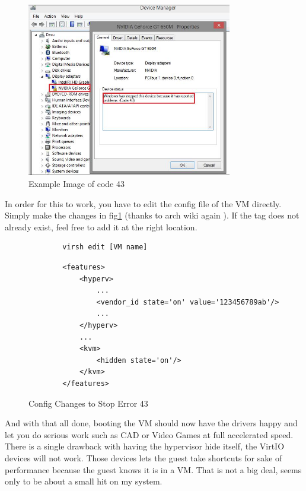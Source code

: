 \documentclass[12pt]{article}
\begin{document}
\begin{figure}[ht]
	\centering
	\includegraphics[width=0.8\textwidth]{error_43.jpg}
	\caption{Example Image of code 43 \cite{image_code43}}
\end{figure}

In order for this to work, you have to edit the config file of the VM directly.
Simply make the changes in fig\ref{fig:config_edit} (thanks to arch wiki again \cite{wiki_arch_ovmf}).
If the tag does not already exist, feel free to add it at the right location.

\begin{figure}[ht]
	\centering
	\small
	\begin{verbatim}
		virsh edit [VM name]
	\end{verbatim}
	\begin{verbatim}
		<features>
			<hyperv>
				...
				<vendor_id state='on' value='123456789ab'/>
				...
			</hyperv>
			...
			<kvm>
				<hidden state='on'/>
			</kvm>
		</features>
	\end{verbatim}
	\vspace{-15pt}
	\caption{Config Changes to Stop Error 43}
	\label{fig:config_edit}
\end{figure}

And with that all done, booting the VM should now have the drivers happy and let you do serious work such as CAD or Video Games at full accelerated speed.
There is a single drawback with having the hypervisor hide itself, the VirtIO devices will not work.
Those devices lets the guest take shortcuts for sake of performance because the guest knows it is in a VM.
That is not a big deal, seems only to be about a small hit on my system.
\end{document}
